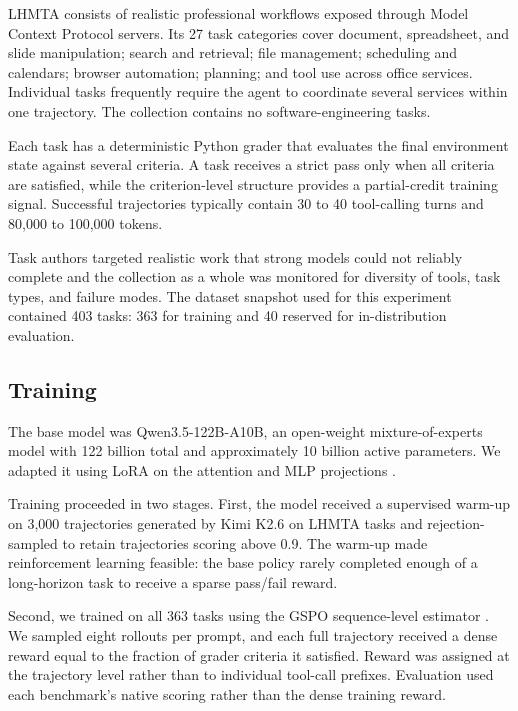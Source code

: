 \documentclass{article}
\begin{document}
LHMTA consists of realistic professional workflows exposed through Model Context Protocol servers. Its 27 task categories cover document, spreadsheet, and slide manipulation; search and retrieval; file management; scheduling and calendars; browser automation; planning; and tool use across office services. Individual tasks frequently require the agent to coordinate several services within one trajectory. The collection contains no software-engineering tasks.

Each task has a deterministic Python grader that evaluates the final environment state against several criteria. A task receives a strict pass only when all criteria are satisfied, while the criterion-level structure provides a partial-credit training signal. Successful trajectories typically contain 30 to 40 tool-calling turns and 80,000 to 100,000 tokens.

Task authors targeted realistic work that strong models could not reliably complete and the collection as a whole was monitored for diversity of tools, task types, and failure modes. The dataset snapshot used for this experiment contained 403 tasks: 363 for training and 40 reserved for in-distribution evaluation.

\subsection{Training}
\label{sec:training}

The base model was Qwen3.5-122B-A10B, an open-weight mixture-of-experts model with 122 billion total and approximately 10 billion active parameters. We adapted it using LoRA on the attention and MLP projections \citep{hu2022lora}.

Training proceeded in two stages. First, the model received a supervised warm-up on 3,000 trajectories generated by Kimi K2.6 on LHMTA tasks and rejection-sampled to retain trajectories scoring above 0.9. The warm-up made reinforcement learning feasible: the base policy rarely completed enough of a long-horizon task to receive a sparse pass/fail reward.

Second, we trained on all 363 tasks using the GSPO sequence-level estimator \citep{zheng2025gspo}. We sampled eight rollouts per prompt, and each full trajectory received a dense reward equal to the fraction of grader criteria it satisfied. Reward was assigned at the trajectory level rather than to individual tool-call prefixes. Evaluation used each benchmark's native scoring rather than the dense training reward.
\end{document}
